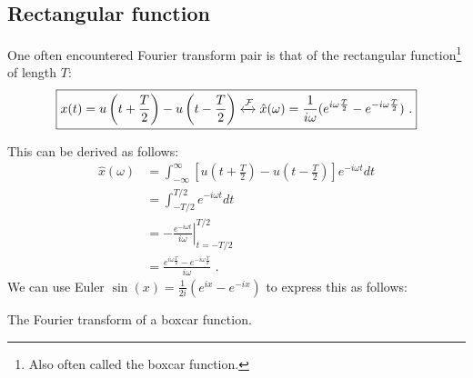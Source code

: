 \subsection{Rectangular function}
One often encountered Fourier transform pair is that of the rectangular function\footnote{Also often called the boxcar function.} of length $T$:
\begin{equation}
\boxed{
x(t)=u\left(t+\frac{T}{2}\right) - u\left(t-\frac{T}{2}\right) \xleftrightarrow{\mathcal{F}} \hat{x}(\omega) = \frac{1}{i\omega}(e^{i\omega \frac{T}{2}} - e^{-i\omega \frac{T}{2}})\,\,.
}
\end{equation}

This can be derived as follows:
\begin{align}
\hat{x}(\omega) &= \int_{-\infty}^{\infty} \left[u\left(t+\frac{T}{2}\right) - u\left(t-\frac{T}{2}\right)\right] e^{-i\omega t}dt \\
&= \int_{-T/2}^{T/2} e^{-i\omega t}dt\\
&=  \left.-\frac{e^{-i\omega t}}{i\omega} \right|_{t=-T/2}^{T/2}\\
&= \frac{e^{i\omega \frac{T}{2}}- e^{-i\omega \frac{T}{2}}}{i\omega}\,\,.
\end{align}
We can use Euler $\sin(x) = \frac{1}{2i} (e^{i x} - e^{-ix})$ to express this as follows:

\begin{marginfigure}
\begin{center}


\end{center}
\caption{The Fourier transform of a boxcar function.}
\end{marginfigure}

